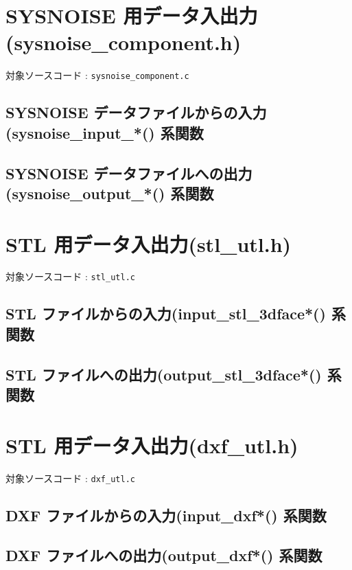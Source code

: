 \documentclass[a4paper,10pt]{jarticle}
\begin{document}

\section{SYSNOISE 用データ入出力(sysnoise\_component.h)}
対象ソースコード : \verb|sysnoise_component.c|

\subsection{SYSNOISE データファイルからの入力(sysnoise\_input\_*() 系関数}

\subsection{SYSNOISE データファイルへの出力(sysnoise\_output\_*() 系関数}


\section{STL 用データ入出力(stl\_utl.h)}
対象ソースコード : \verb|stl_utl.c|

\subsection{STL ファイルからの入力(input\_stl\_3dface*() 系関数}

\subsection{STL ファイルへの出力(output\_stl\_3dface*() 系関数}


\section{STL 用データ入出力(dxf\_utl.h)}
対象ソースコード : \verb|dxf_utl.c|

\subsection{DXF ファイルからの入力(input\_dxf*() 系関数}

\subsection{DXF ファイルへの出力(output\_dxf*() 系関数}
\end{document}
